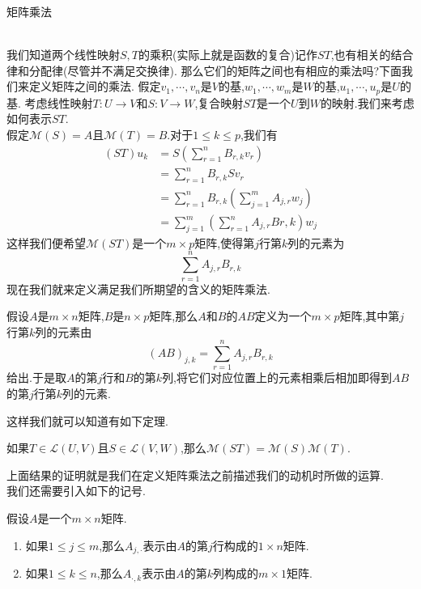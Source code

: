 \documentclass{ctexart}
\begin{document}
\pagestyle{empty}
\begin{center}\large 矩阵乘法\end{center}
\\
我们知道两个线性映射$S,T$的乘积(实际上就是函数的复合)记作$ST$,也有相关的结合律和分配律(尽管并不满足交换律).
那么它们的矩阵之间也有相应的乘法吗?下面我们来定义矩阵之间的乘法.
假定$v_1,\cdots,v_n$是$V$的基,$w_1,\cdots,w_m$是$W$的基,$u_1,\cdots,u_p$是$U$的基.
考虑线性映射$T:U\to V$和$S:V\to W$,复合映射$ST$是一个$U$到$W$的映射.我们来考虑如何表示$ST$.\\
假定$\mathcal{M}(S)=A$且$\mathcal{M}(T)=B$.对于$1\leqslant k\leqslant p$,我们有
$$\begin{aligned}
    (ST)u_k
    &= S\left(\sum_{r=1}^{n}B_{r,k}v_r\right) \\
    &= \sum_{r=1}^{n}B_{r,k}Sv_r \\
    &= \sum_{r=1}^{n}B_{r,k}\left(\sum_{j=1}^{m}A_{j,r}w_j\right) \\
    &= \sum_{j=1}^{m}\left(\sum_{r=1}^{n}A_{j,r}B{r,k}\right)w_j
\end{aligned}$$
这样我们便希望$\mathcal{M}(ST)$是一个$m\times p$矩阵,使得第$j$行第$k$列的元素为
$$\sum_{r=1}^{n}A_{j,r}B_{r,k}$$
现在我们就来定义满足我们所期望的含义的矩阵乘法.
\begin{definition}[1.1 矩阵乘法]
    假设$A$是$m\times n$矩阵,$B$是$n\times p$矩阵,那么$A$和$B$的$AB$定义为一个$m\times p$矩阵,其中第$j$行第$k$列的元素由
    $$(AB)_{j,k}=\sum_{r=1}^{n}A_{j,r}B_{r,k}$$
    给出.于是取$A$的第$j$行和$B$的第$k$列,将它们对应位置上的元素相乘后相加即得到$AB$的第$j$行第$k$列的元素.
\end{definition}\noindent
这样我们就可以知道有如下定理.
\begin{formal}[1.2 线性映射之积的矩阵]
    如果$T\in\mathcal{L}(U,V)$且$S\in\mathcal{L}(V,W)$,那么$\mathcal{M}(ST)=\mathcal{M}(S)\mathcal{M}(T)$.
\end{formal}\noindent
上面结果的证明就是我们在定义矩阵乘法之前描述我们的动机时所做的运算.\\
我们还需要引入如下的记号.
\begin{definition}
    假设$A$是一个$m\times n$矩阵.
    \begin{enumerate}[label=\tbf{(\alph*)}]
        \item 如果$1\leqslant j\leqslant m$,那么$A_{j,\cdot}$表示由$A$的第$j$行构成的$1\times n$矩阵.
        \item 如果$1\leqslant k\leqslant n$,那么$A_{\cdot,k}$表示由$A$的第$k$列构成的$m\times 1$矩阵.
    \end{enumerate}
\end{definition}\noindent
\end{document}
